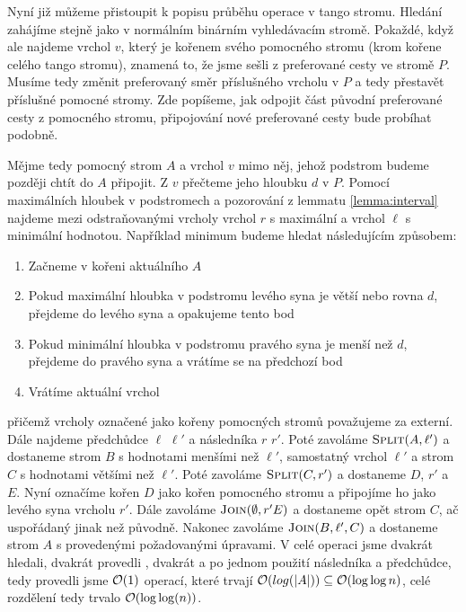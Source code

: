 Nyní již můžeme přistoupit k popisu průběhu operace  v tango stromu. Hledání zahájíme stejně jako v normálním binárním vyhledávacím stromě. Pokaždé, když ale najdeme vrchol $v$, který je kořenem svého pomocného stromu (krom kořene celého tango stromu), znamená to, že jsme sešli z preferované cesty ve stromě $P$. Musíme tedy změnit preferovaný směr příslušného vrcholu v $P$ a tedy přestavět příslušné pomocné stromy. Zde popíšeme, jak odpojit část původní preferované cesty z pomocného stromu, připojování nové preferované cesty bude probíhat podobně.

Mějme tedy pomocný strom $A$ a vrchol $v$ mimo něj, jehož podstrom budeme později chtít do $A$ připojit. Z $v$ přečteme jeho hloubku $d$ v $P$. Pomocí maximálních hloubek v podstromech a pozorování z lemmatu \ref{lemma:interval} najdeme mezi odstraňovanými vrcholy vrchol $r$ s maximální a vrchol $\ell$ s minimální hodnotou. Například minimum budeme hledat následujícím způsobem:

\begin{enumerate}
\item Začneme v kořeni aktuálního $A$
\item Pokud maximální hloubka v podstromu levého syna je větší nebo rovna $d$, přejdeme do levého syna a opakujeme tento bod
\item Pokud minimální hloubka v podstromu pravého syna je menší než $d$, přejdeme do pravého syna a vrátíme se na předchozí bod
\item Vrátíme aktuální vrchol
\end{enumerate}

přičemž vrcholy označené jako kořeny pomocných stromů považujeme za externí.
Dále najdeme předchůdce $\ell$ $\ell'$ a následníka $r$ $r'$. Poté zavoláme
$\ope{Split}(A, \ell')$ a dostaneme strom $B$ s hodnotami menšími než $\ell'$,
samostatný vrchol $\ell'$ a strom $C$ s hodnotami většími než $\ell'$. Poté
zavoláme $\ope{Split}(C,r')$ a dostaneme $D$, $r'$ a $E$. Nyní označíme kořen
$D$ jako kořen pomocného stromu a připojíme ho jako levého syna vrcholu $r'$.
Dále zavoláme $\ope{Join}(\emptyset, r' E)$ a dostaneme opět strom $C$, ač
uspořádaný jinak než původně. Nakonec zavoláme $\ope{Join}(B,\ell',C)$ a
dostaneme strom $A$ s provedenými požadovanými úpravami. V celé operaci jsme
dvakrát hledali, dvakrát provedli , dvakrát  a po jednom
použití následníka a předchůdce, tedy provedli jsme $\mathcal O(1)$ operací, které
trvají $\mathcal O(log(|A|))\subseteq \mathcal O(\log\log n)$, celé rozdělení tedy trvalo
$\mathcal O(\log\log(n))$.



